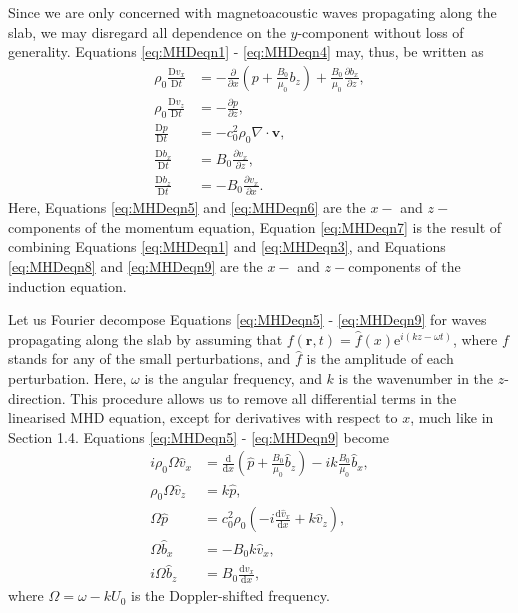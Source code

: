 Since we are only concerned with magnetoacoustic waves propagating along the slab, we may disregard all dependence on the $y$-component without loss of generality. 
Equations \eqref{eq:MHDeqn1} - \eqref{eq:MHDeqn4} may, thus, be written as
\begin{align}
\label{eq:MHDeqn5}
\rho_0 \frac{\mathrm{D} v_x}{\mathrm{D} t}
& = - \frac{\partial}{\partial x} \left(p + \frac{B_0}{\mu_0} b_z \right)
+ \frac{B_0}{\mu_0} \frac{\partial b_x}{\partial z},
\\[0.3cm]
\label{eq:MHDeqn6}
\rho_0 \frac{\mathrm{D} v_z}{\mathrm{D} t}
& = - \frac{\partial p}{\partial z},
\\[0.3cm]
\label{eq:MHDeqn7}
\frac{\mathrm{D} p}{\mathrm{D} t} &
= - c_0^2 \rho_0 \nabla \cdot \mathbf{v},
\\[0.3cm]
\label{eq:MHDeqn8}
\frac{\mathrm{D} b_x}{\mathrm{D} t}
& = B_0 \frac{\partial v_x}{\partial z},
\\[0.3cm]
\label{eq:MHDeqn9}
\frac{\mathrm{D} b_z}{\mathrm{D} t}
& = - B_0 \frac{\partial v_x}{\partial x}.
\end{align}
Here, Equations \eqref{eq:MHDeqn5} and \eqref{eq:MHDeqn6} are the $x-$ and $z-$components of the momentum equation, Equation \eqref{eq:MHDeqn7} is the result of combining Equations \eqref{eq:MHDeqn1} and \eqref{eq:MHDeqn3}, and Equations \eqref{eq:MHDeqn8} and \eqref{eq:MHDeqn9} are the $x-$ and $z-$components of the induction equation.

Let us Fourier decompose Equations \eqref{eq:MHDeqn5} - \eqref{eq:MHDeqn9} for waves propagating along the slab by assuming that $f(\mathbf{r}, t) = \hat{f}(x) \mathrm{e}^{i(k z - \omega t)}$, where $f$ stands for any of the small perturbations, and $\hat{f}$ is the amplitude of each perturbation.
Here, $\omega$ is the angular frequency, and $k$ is the wavenumber in the $z$-direction.
This procedure allows us to remove all differential terms in the linearised MHD equation, except for derivatives with respect to $x$, much like in Section 1.4.
Equations \eqref{eq:MHDeqn5} - \eqref{eq:MHDeqn9} become
\begin{align}
\label{eq:MHDeqn10}
i \rho_0 \Omega \hat v_x
& = \frac{\mathrm{d}}{\mathrm{d} x} \left(\hat p + \frac{B_0}{\mu_0} \hat b_z \right)
- ik \frac{B_0}{\mu_0} \hat b_x,
\\[0.3cm]
\label{eq:MHDeqn11}
\rho_0 \Omega \hat v_z
& = k \hat p,
\\[0.3cm]
\label{eq:MHDeqn12}
\Omega \hat p
& = c_0^2 \rho_0 (- i \frac{\mathrm{d} \hat v_x}{\mathrm{d} x} + k \hat v_z),
\\[0.3cm]
\label{eq:MHDeqn13}
\Omega \hat b_x
& = - B_0 k \hat v_x,
\\[0.3cm]
\label{eq:MHDeqn14}
i \Omega \hat b_z
& = B_0 \frac{\mathrm{d} \hat v_x}{\mathrm{d} x},
\end{align}
where $\Omega = \omega - k U_0$ is the Doppler-shifted frequency.

